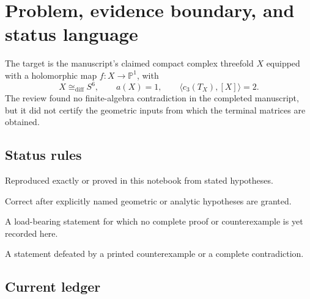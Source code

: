 \section{Problem, evidence boundary, and status language}

The target is the manuscript's claimed compact complex threefold $X$ equipped with a holomorphic map $f\colon X\to\mathbb P^1$, with
\[
X\cong_{\mathrm{diff}}S^6,\qquad a(X)=1,\qquad
\langle c_3(T_X),[X]\rangle=2.
\]
The review found no finite-algebra contradiction in the completed manuscript, but it did not certify the geometric inputs from which the terminal matrices are obtained.

\subsection{Status rules}

\begin{description}[leftmargin=8.4em,style=nextline]
\item[\Verified] Reproduced exactly or proved in this notebook from stated hypotheses.
\item[\Conditional] Correct after explicitly named geometric or analytic hypotheses are granted.
\item[\Open] A load-bearing statement for which no complete proof or counterexample is yet recorded here.
\item[\Refuted] A statement defeated by a printed counterexample or a complete contradiction.
\end{description}

\subsection{Current ledger}

